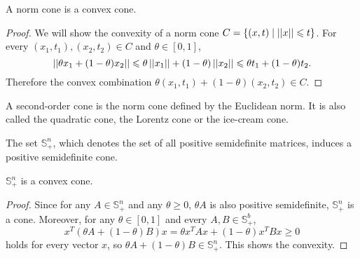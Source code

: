 \documentclass[12pt]{article}
\begin{document}
\begin{proposition}
    A norm cone is a convex cone.
\end{proposition}
\begin{proof}
    We will show the convexity of a norm cone \(C=\left\{(x,t)\mid \left|\left|x\right|\right|\leqslant t\right\}\). For every \((x_1,t_1),\allowbreak(x_2,t_2)\in C\) and \(\theta\in[0,1]\),
    \[\left|\left|\theta x_1+(1-\theta)x_2\right|\right|\leqslant\theta\left|\left|x_1\right|\right|+(1-\theta)\left|\left|x_2\right|\right|\leqslant\theta t_1+(1-\theta)t_2.\]
    Therefore the convex combination \(\theta(x_1,t_1)+(1-\theta)(x_2,t_2)\in C\).
\end{proof}

\begin{definition}
    A \textnormal{second-order cone} is the norm cone defined by the Euclidean norm. It is also called the \textnormal{quadratic cone}, the \textnormal{Lorentz cone} or the \textnormal{ice-cream cone}.
\end{definition}

\begin{definition}
    The set \(\mathbb S^n_+\), which denotes the set of all positive semidefinite matrices, induces a \textnormal{positive semidefinite cone}.
\end{definition}

\begin{proposition}
    \(\mathbb S^n_+\) is a convex cone.
\end{proposition}
\begin{proof}
    Since for any \(A\in\mathbb S^n_+\) and any \(\theta\geqslant 0\), \(\theta A\) is also positive semidefinite, \(\mathbb S^n_+\) is a cone. Moreover, for any \(\theta\in[0,1]\) and every \(A,B\in\mathbb S^b_+\),
    \[x^T\left(\theta A+(1-\theta)B\right)x=\theta x^TAx+(1-\theta)x^TBx\geqslant 0\]
    holds for every vector \(x\), so \(\theta A+(1-\theta)B\in\mathbb S^n_+\). This shows the convexity.
\end{proof}
\end{document}
